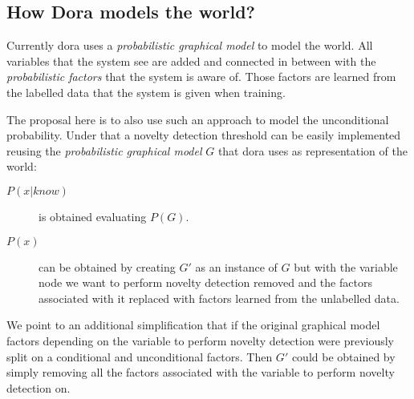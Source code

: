 \documentclass[a4paper]{article}
\begin{document}
\subsection{How Dora models the world?}
\label{sec:dora-models}

Currently dora uses a \emph{probabilistic graphical model} to model the world.
All variables that the system see are added and connected in between with the
\emph{probabilistic factors} that the system is aware of.
Those factors are learned from the labelled data that the system is given when
training.

The proposal here is to also use such an approach to model the unconditional
probability.
Under that a novelty detection threshold can be easily implemented
reusing the \emph{probabilistic graphical model} $G$ that dora uses as
representation of the world:
\begin{description}
\item[$P(x|know)$] is obtained evaluating $P(G)$.
\item[$P(x)$] can be obtained by creating $G'$ as an instance of $G$ but with the
variable node we want to perform novelty detection removed and the factors associated
with it replaced with factors learned from the unlabelled data.
\end{description}

We point to an additional simplification that if the original graphical model factors
depending on the variable to perform novelty detection were previously split on a
conditional and unconditional factors. Then $G'$ could be obtained by simply removing
all the factors associated with the variable to perform novelty detection on.


\cleardoublepage
{}
{}



\end{document}
